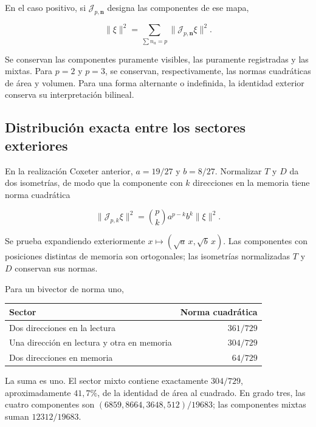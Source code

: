 En el caso positivo, si
\(\mathcal J_{p,\mathbf n}\) designa las componentes de ese mapa,



\begin{equation}
\boxed{\|\xi\|^2=\sum_{\sum n_a=p}
\|\mathcal J_{p,\mathbf n}\xi\|^2.}
\label{x_reciprocidad:nuc11:eq:21}
\end{equation}



Se conservan las componentes puramente visibles, las puramente
registradas y las mixtas.
Para \(p=2\) y \(p=3\), se conservan, respectivamente, las normas
cuadráticas de área y volumen.
Para una forma alternante o indefinida, la identidad exterior
conserva su interpretación bilineal.

\subsection{Distribución exacta entre los sectores exteriores}

En la realización Coxeter anterior,
\(a=19/27\) y \(b=8/27\).
Normalizar \(T\) y \(D\) da dos isometrías, de modo que la
componente con \(k\) direcciones en la memoria tiene norma cuadrática



\begin{equation}
\boxed{
\|\mathcal J_{p,k}\xi\|^2=
\binom pk a^{p-k}b^k\|\xi\|^2.
}
\label{x_reciprocidad:nuc11:eq:22}
\end{equation}



Se prueba expandiendo exteriormente
\(x\mapsto(\sqrt a\,x,\sqrt b\,x)\).
Las componentes con posiciones distintas de memoria son
ortogonales; las isometrías normalizadas \(T\) y \(D\)
conservan sus normas.

Para un bivector de norma uno,

\begin{center}
\begin{tabular}{@{}lr@{}}
\toprule
Sector & Norma cuadrática\\
\midrule
Dos direcciones en la lectura & \(361/729\)\\
Una dirección en lectura y otra en memoria & \(304/729\)\\
Dos direcciones en memoria & \(64/729\)\\
\bottomrule
\end{tabular}
\end{center}

La suma es uno. El sector mixto contiene exactamente \(304/729\),
aproximadamente \(41{,}7\%\), de la identidad de área al cuadrado.
En grado tres, las cuatro componentes son
\((6859,8664,3648,512)/19683\); las componentes mixtas suman
\(12312/19683\).

